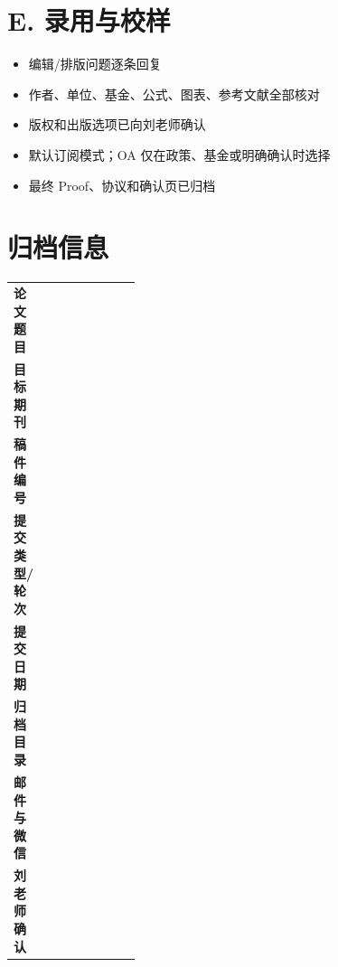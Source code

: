 \documentclass[UTF8,11pt]{ctexart}
\newcommand{\checkbox}{\ensuremath{\square}}
\begin{document}
\section{E. 录用与校样}
\begin{itemize}
\item[\checkbox] 编辑/排版问题逐条回复
\item[\checkbox] 作者、单位、基金、公式、图表、参考文献全部核对
\item[\checkbox] 版权和出版选项已向刘老师确认
\item[\checkbox] 默认订阅模式；OA 仅在政策、基金或明确确认时选择
\item[\checkbox] 最终 Proof、协议和确认页已归档
\end{itemize}
\section{归档信息}
\begin{tabularx}{\linewidth}{>{\bfseries}p{0.28\linewidth}X}
论文题目 & \\[0.7em]
目标期刊 & \\[0.7em]
稿件编号 & \\[0.7em]
提交类型/轮次 & \\[0.7em]
提交日期 & \\[0.7em]
归档目录 & \\[0.7em]
邮件与微信 & \\[0.7em]
刘老师确认 & \\[0.7em]
\end{tabularx}
\end{document}
